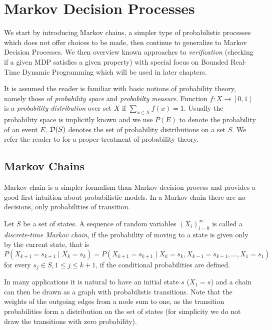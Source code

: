 \chapter{Markov Decision Processes}
\label{ch_mdp}

We start by introducing Markov chains, a simpler type of
probabilistic processes which does not offer choices to be made,
then continue to generalize to Markov Decision Processes.
We then overview known approaches to {\em verification} (checking if a
given MDP satisfies a given property) with special focus on Bounded
Real-Time Dynamic Programming which will be used in later chapters.

It is assumed the reader is familiar with basic notions of probability
theory, namely those of {\em probability space} and {\em probabilty measure}.
Function $f : X \to [0,1]$ is a {\em probability distribution} over
set $X$ if $\sum_{x \in X} f(x) = 1$.
Usually the probability space is implicitly known and we use $P(E)$ to
denote the probability of an event $E$. $\mathcal{D}(S)$ denotes the
set of probability distributions on a set $S$.  We refer the reader to
\parencite{probability} for a proper treatment of probability theory.

\section{Markov Chains}

Markov chain is a simpler formalism than
Markov decision process and provides a good first intuition about
probabilistic models. In a Markov chain there are no decisions, only
probabilities of transition.

\begin{definition}
    Let $S$ be a set of states.
    A sequence of random variables $(X_i)^{\infty}_{i=0}$
    is called a {\em discrete-time Markov chain},
    if the probability of moving to a state is given only by the
    current state, that is
    $P(X_{k+1} = s_{k+1} \mid X_k = s_k) =
    P(X_{k+1} = s_{k+1} \mid X_k = s_k, X_{k-1} = s_{k-1},
    \ldots, X_{1} = s_{1})$ for every $s_j \in S, 1 \leq j \leq k + 1$,
    if the conditional probabilities are defined.
\end{definition}

In many applications it is natural to have an initial state
$s$ ($X_1 = s$) and a chain can
then be drawn as a graph with probabilistic transitions. Note
that the weights of the outgoing edges from a node sum to one, as the
transition probabilities form a distribution on the set of states (for
simplicity we do not draw the transitions with zero probability).

